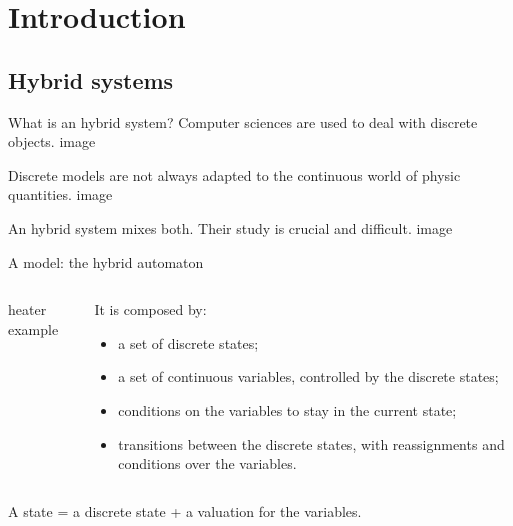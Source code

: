 \section{Introduction}
\subsection{Hybrid systems}
\begin{frame}{What is an hybrid system?}
Computer sciences are used to deal with discrete objects.
image

Discrete models are not always adapted to the continuous world of physic quantities.
image

An hybrid system mixes both. Their study is crucial and difficult.
image

\end{frame}

\begin{frame}{A model: the hybrid automaton}
\begin{columns}[c]

\begin{column}{5cm}
heater example
\end{column}

\begin{column}{5cm}
It is composed by:
\begin{itemize}
\item a set of discrete states;
\item a set of continuous variables, controlled by the discrete states;
\item conditions on the variables to stay in the current state;
\item transitions between the discrete states, with reassignments and conditions over the variables.
\end{itemize}
\end{column}


\end{columns}

\vspace*{1cm}

A state = a discrete state + a valuation for the variables.
\end{frame}

